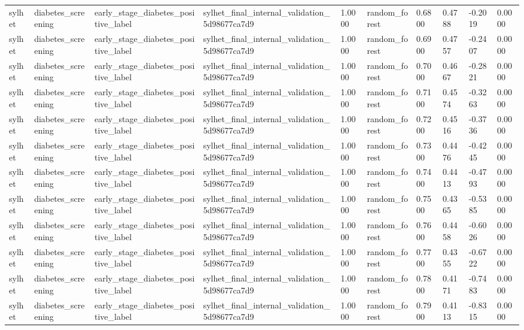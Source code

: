 \begin{tabular}{llllllllll}
sylhet & diabetes\_screening & early\_stage\_diabetes\_positive\_label & sylhet\_final\_internal\_validation\_5d98677ca7d9 & 1.0000 & random\_forest & 0.6800 & 0.4788 & -0.2019 & 0.0000 \\
sylhet & diabetes\_screening & early\_stage\_diabetes\_positive\_label & sylhet\_final\_internal\_validation\_5d98677ca7d9 & 1.0000 & random\_forest & 0.6900 & 0.4757 & -0.2407 & 0.0000 \\
sylhet & diabetes\_screening & early\_stage\_diabetes\_positive\_label & sylhet\_final\_internal\_validation\_5d98677ca7d9 & 1.0000 & random\_forest & 0.7000 & 0.4667 & -0.2821 & 0.0000 \\
sylhet & diabetes\_screening & early\_stage\_diabetes\_positive\_label & sylhet\_final\_internal\_validation\_5d98677ca7d9 & 1.0000 & random\_forest & 0.7100 & 0.4574 & -0.3263 & 0.0000 \\
sylhet & diabetes\_screening & early\_stage\_diabetes\_positive\_label & sylhet\_final\_internal\_validation\_5d98677ca7d9 & 1.0000 & random\_forest & 0.7200 & 0.4516 & -0.3736 & 0.0000 \\
sylhet & diabetes\_screening & early\_stage\_diabetes\_positive\_label & sylhet\_final\_internal\_validation\_5d98677ca7d9 & 1.0000 & random\_forest & 0.7300 & 0.4476 & -0.4245 & 0.0000 \\
sylhet & diabetes\_screening & early\_stage\_diabetes\_positive\_label & sylhet\_final\_internal\_validation\_5d98677ca7d9 & 1.0000 & random\_forest & 0.7400 & 0.4413 & -0.4793 & 0.0000 \\
sylhet & diabetes\_screening & early\_stage\_diabetes\_positive\_label & sylhet\_final\_internal\_validation\_5d98677ca7d9 & 1.0000 & random\_forest & 0.7500 & 0.4365 & -0.5385 & 0.0000 \\
sylhet & diabetes\_screening & early\_stage\_diabetes\_positive\_label & sylhet\_final\_internal\_validation\_5d98677ca7d9 & 1.0000 & random\_forest & 0.7600 & 0.4458 & -0.6026 & 0.0000 \\
sylhet & diabetes\_screening & early\_stage\_diabetes\_positive\_label & sylhet\_final\_internal\_validation\_5d98677ca7d9 & 1.0000 & random\_forest & 0.7700 & 0.4355 & -0.6722 & 0.0000 \\
sylhet & diabetes\_screening & early\_stage\_diabetes\_positive\_label & sylhet\_final\_internal\_validation\_5d98677ca7d9 & 1.0000 & random\_forest & 0.7800 & 0.4171 & -0.7483 & 0.0000 \\
sylhet & diabetes\_screening & early\_stage\_diabetes\_positive\_label & sylhet\_final\_internal\_validation\_5d98677ca7d9 & 1.0000 & random\_forest & 0.7900 & 0.4113 & -0.8315 & 0.0000 \\

\end{tabular}
